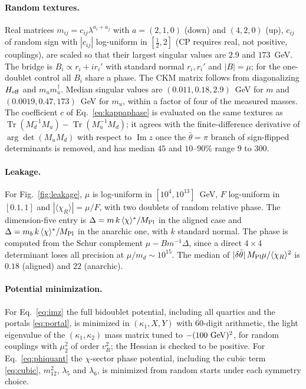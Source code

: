\documentclass[submission, Phys]{SciPost}
\newcommand{\bt}{\bar\theta}
\newcommand{\MPl}{M_{\rm Pl}}
\newcommand{\vev}[1]{\langle #1\rangle}
\DeclareMathOperator{\Tr}{Tr}
\renewcommand{\Im}{\operatorname{Im}}
\begin{document}
\begin{appendix}
\paragraph{Random textures.} Real matrices $m_{ij}=c_{ij}\lambda^{a_i+a_j}$
with $a=(2,1,0)$ (down) and $(4,2,0)$ (up), $c_{ij}$ of random sign with
$|c_{ij}|$ log-uniform in $[\tfrac12,2]$ (CP requires real, not
positive, couplings), are scaled so that their largest singular values
are $2.9$ and $173$~GeV. The bridge is $B_i\propto r_i+ir_i'$ with standard
normal $r_i,r_i'$ and $|B|=\mu$; for the one-doublet control all $B_i$
share a phase. The CKM matrix follows from diagonalizing $H_{\rm eff}$
and $m_um_u^\dagger$. Median singular values are $(0.011,0.18,2.9)$~GeV
for $m$ and $(0.0019,0.47,173)$~GeV for $m_u$, within a factor of four
of the measured masses. The coefficient $c$ of
Eq.~\eqref{eq:kappaphase} is evaluated on the same textures as
$\Tr(M_d^{-1}M_u)-\Tr(M_u^{-1}M_d)$; it agrees with the finite-difference
derivative of $\arg\det(M_uM_d)$ with respect to $\Im z$ once the
$\bt=\pi$ branch of sign-flipped determinants is removed, and has median
$45$ and $10$--$90\%$ range $9$ to $300$.

\paragraph{Leakage.} For Fig.~\ref{fig:leakage}, $\mu$ is log-uniform in
$[10^4,10^{13}]$~GeV, $F$ log-uniform in $[0.1,1]$ and
$|\vev{\chi_R}|=\mu/F$, with two doublets of random relative phase.
The dimension-five entry is $\Delta=m\,k\,\vev{\chi}^*/\MPl$ in the aligned
case and $\Delta=m_b\,k\,\vev{\chi}^*/\MPl$ in the anarchic one, with
$k$ standard normal. The phase is computed from the Schur complement
$\mu-Bm^{-1}\Delta$, since a direct $4\times4$ determinant loses all
precision at $\mu/m_d\sim10^{15}$. The median of
$|\delta\bt|\,\MPl\mu/\vev{\chi_R}^2$ is $0.18$ (aligned) and $22$
(anarchic).

\paragraph{Potential minimization.} For Eq.~\eqref{eq:imz} the full
bidoublet potential, including all quartics and the portals
\eqref{eq:portal}, is minimized in $(\kappa_1,X,Y)$ with $60$-digit
arithmetic, the light eigenvalue of the $(\kappa_1,\kappa_2)$ mass matrix
tuned to $-(100~{\rm GeV})^2$, for random couplings with $\mu_2^2$ of order
$v_R^2$; the Hessian is checked to be positive. For
Eq.~\eqref{eq:phiquant} the $\chi$-sector phase potential, including the
cubic term \eqref{eq:cubic}, $m_{12}^2$, $\lambda_5$ and $\lambda_6$, is
minimized from random starts under each symmetry choice.


\end{appendix}
\end{document}
